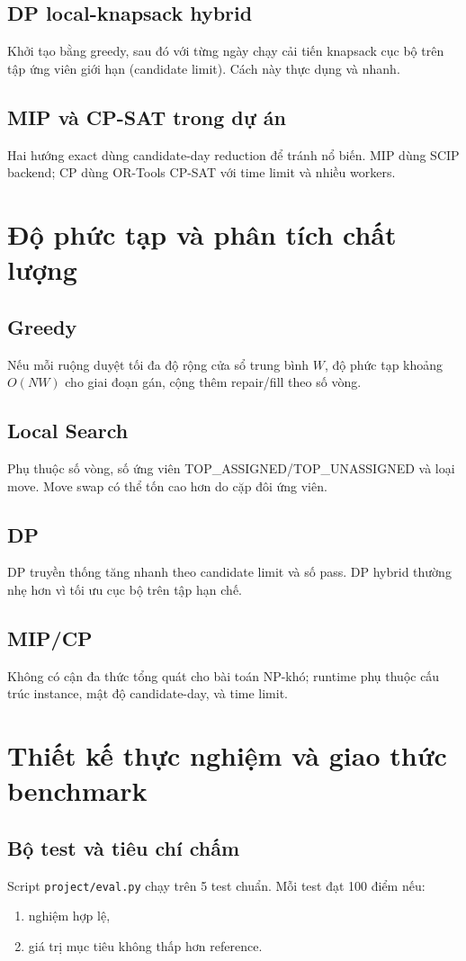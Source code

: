 \documentclass[12pt,a4paper]{article}
\begin{document}
\subsection{DP local-knapsack hybrid}
Khởi tạo bằng greedy, sau đó với từng ngày chạy cải tiến knapsack cục bộ trên tập ứng viên giới hạn (candidate limit). Cách này thực dụng và nhanh.

\subsection{MIP và CP-SAT trong dự án}
Hai hướng exact dùng candidate-day reduction để tránh nổ biến.
MIP dùng SCIP backend; CP dùng OR-Tools CP-SAT với time limit và nhiều workers.

\section{Độ phức tạp và phân tích chất lượng}
\subsection{Greedy}
Nếu mỗi ruộng duyệt tối đa độ rộng cửa sổ trung bình $W$, độ phức tạp khoảng $O(NW)$ cho giai đoạn gán, cộng thêm repair/fill theo số vòng.

\subsection{Local Search}
Phụ thuộc số vòng, số ứng viên TOP\_ASSIGNED/TOP\_UNASSIGNED và loại move. Move swap có thể tốn cao hơn do cặp đôi ứng viên.

\subsection{DP}
DP truyền thống tăng nhanh theo candidate limit và số pass. DP hybrid thường nhẹ hơn vì tối ưu cục bộ trên tập hạn chế.

\subsection{MIP/CP}
Không có cận đa thức tổng quát cho bài toán NP-khó; runtime phụ thuộc cấu trúc instance, mật độ candidate-day, và time limit.

\section{Thiết kế thực nghiệm và giao thức benchmark}
\subsection{Bộ test và tiêu chí chấm}
Script \texttt{project/eval.py} chạy trên 5 test chuẩn. Mỗi test đạt 100 điểm nếu:
\begin{enumerate}
  \item nghiệm hợp lệ,
  \item giá trị mục tiêu không thấp hơn reference.
\end{enumerate}
\end{document}
